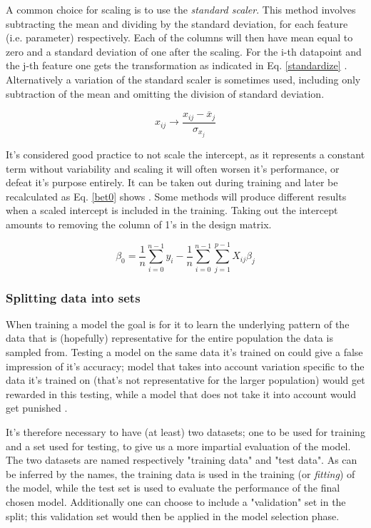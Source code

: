 A common choice for scaling is to use the \textit{standard scaler}. This method involves subtracting the mean and dividing by the standard deviation, for each feature (i.e. parameter) respectively. Each of the columns will then have mean equal to zero and a standard deviation of one after the scaling. For the i-th datapoint and the j-th feature one gets the transformation as indicated in Eq. \ref{standardize} \citep[Linear Regression]{morten}. Alternatively a variation of the standard scaler is sometimes used, including only subtraction of the mean and omitting the division of standard deviation.

\begin{equation}\label{standardize}
    x_{ij} \rightarrow \frac{x_{ij}-\overline{x}_j}{\sigma_{x_j}}
\end{equation}

It's considered good practice to not scale the intercept, as it represents a constant term without variability and scaling it will often worsen it's performance, or defeat it's purpose entirely. It can be taken out during training and later be recalculated as Eq. \ref{bet0} shows \citep[Resampling methods]{morten}. Some methods will produce different results when a scaled intercept is included in the training. Taking out the intercept amounts to removing the column of 1's in the design matrix. 

\begin{equation}\label{bet0}
    \beta_0 = \frac{1}{n}\sum_{i=0}^{n-1}y_i - \frac{1}{n}\sum_{i=0}^{n-1}\sum_{j=1}^{p-1}X_{ij}\beta_j
\end{equation}

\subsubsection{Splitting data into sets}\label{overfitting}

When training a model the goal is for it to learn the underlying pattern of the data that is (hopefully) representative for the entire population the data is sampled from. 
Testing a model on the same data it's trained on could give a false impression of it's accuracy; model that takes into account variation specific to the data it's trained on (that's not representative for the larger population) would get rewarded in this testing, while a model that does not take it into account would get punished \cite[p. 228]{hastie}. 

It's therefore necessary to have (at least) two datasets; one to be used for training and a set used for testing, to give us a more impartial evaluation of the model. The two datasets are named respectively "training data" and "test data". As can be inferred by the names, the training data is used in the training (or \textit{fitting}) of the model, while the test set is used to evaluate the performance of the final chosen model. 
Additionally one can choose to include a "validation" set in the split; this validation set would then be applied in the model selection phase.

